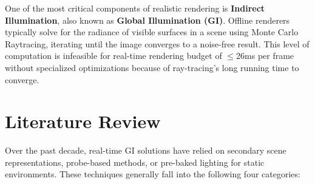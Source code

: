 \documentclass[sigconf, nonacm]{acmart}
\begin{document}


One of the most critical components of realistic rendering is \textbf{Indirect Illumination}, also known as \textbf{Global Illumination (GI)}. Offline renderers typically solve for the radiance of visible surfaces in a scene using Monte Carlo Raytracing\cite{kajiya}, iterating until the image converges to a noise-free result. This level of computation is infeasible for real-time rendering budget of $\le$26ms per frame without specialized optimizations because of ray-tracing's long running time to converge.


\section{Literature Review}

Over the past decade, real-time GI solutions have relied on secondary scene representations, probe-based methods, or pre-baked lighting for static environments. These techniques generally fall into the following four categories:
\end{document}
